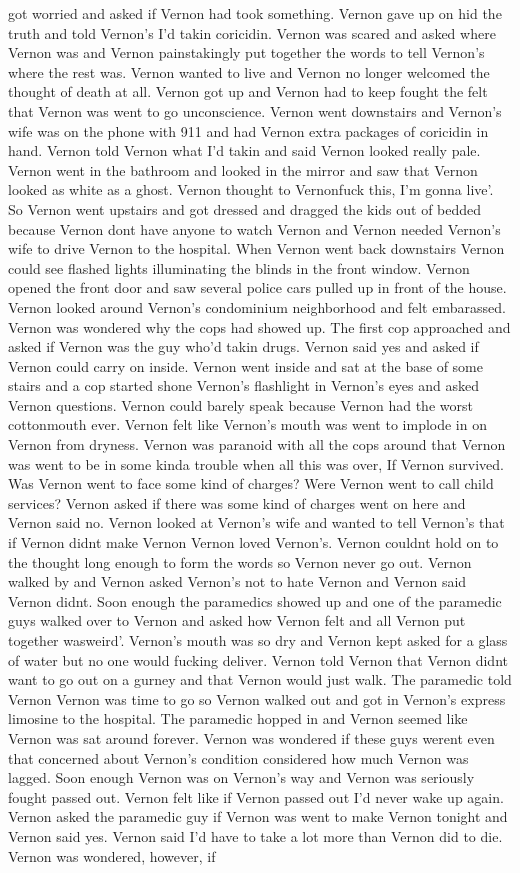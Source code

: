 \documentclass[12pt]{book}
\begin{document}
got worried and asked if Vernon had took something. Vernon gave up on hid the truth and told Vernon's I'd takin coricidin. Vernon was scared and asked where Vernon was and Vernon painstakingly put together the words to tell Vernon's where the rest was. Vernon wanted to live and Vernon no longer welcomed the thought of death at all. Vernon got up and Vernon had to keep fought the felt that Vernon was went to go unconscience. Vernon went downstairs and Vernon's wife was on the phone with 911 and had Vernon extra packages of coricidin in hand. Vernon told Vernon what I'd takin and said Vernon looked really pale. Vernon went in the bathroom and looked in the mirror and saw that Vernon looked as white as a ghost. Vernon thought to Vernonfuck this, I'm gonna live'. So Vernon went upstairs and got dressed and dragged the kids out of bedded because Vernon dont have anyone to watch Vernon and Vernon needed Vernon's wife to drive Vernon to the hospital. When Vernon went back downstairs Vernon could see flashed lights illuminating the blinds in the front window. Vernon opened the front door and saw several police cars pulled up in front of the house. Vernon looked around Vernon's condominium neighborhood and felt embarassed. Vernon was wondered why the cops had showed up. The first cop approached and asked if Vernon was the guy who'd takin drugs. Vernon said yes and asked if Vernon could carry on inside. Vernon went inside and sat at the base of some stairs and a cop started shone Vernon's flashlight in Vernon's eyes and asked Vernon questions. Vernon could barely speak because Vernon had the worst cottonmouth ever. Vernon felt like Vernon's mouth was went to implode in on Vernon from dryness. Vernon was paranoid with all the cops around that Vernon was went to be in some kinda trouble when all this was over, If Vernon survived. Was Vernon went to face some kind of charges? Were Vernon went to call child services? Vernon asked if there was some kind of charges went on here and Vernon said no. Vernon looked at Vernon's wife and wanted to tell Vernon's that if Vernon didnt make Vernon Vernon loved Vernon's. Vernon couldnt hold on to the thought long enough to form the words so Vernon never go out. Vernon walked by and Vernon asked Vernon's not to hate Vernon and Vernon said Vernon didnt. Soon enough the paramedics showed up and one of the paramedic guys walked over to Vernon and asked how Vernon felt and all Vernon put together wasweird'. Vernon's mouth was so dry and Vernon kept asked for a glass of water but no one would fucking deliver. Vernon told Vernon that Vernon didnt want to go out on a gurney and that Vernon would just walk. The paramedic told Vernon Vernon was time to go so Vernon walked out and got in Vernon's express limosine to the hospital. The paramedic hopped in and Vernon seemed like Vernon was sat around forever. Vernon was wondered if these guys werent even that concerned about Vernon's condition considered how much Vernon was lagged. Soon enough Vernon was on Vernon's way and Vernon was seriously fought passed out. Vernon felt like if Vernon passed out I'd never wake up again. Vernon asked the paramedic guy if Vernon was went to make Vernon tonight and Vernon said yes. Vernon said I'd have to take a lot more than Vernon did to die. Vernon was wondered, however, if 
\end{document}
